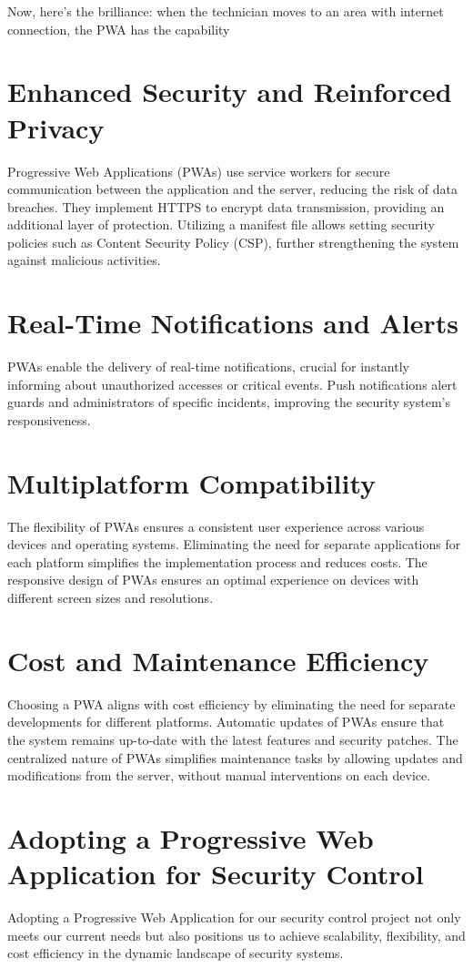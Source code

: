 \documentclass[journal]{IEEEtran}
\begin{document}
	Now, here's the brilliance: when the technician moves to an area with internet connection, the PWA has the capability
	
	\section*{Enhanced Security and Reinforced Privacy}
	Progressive Web Applications (PWAs) use service workers for secure communication between the application and the server, reducing the risk of data breaches. They implement HTTPS to encrypt data transmission, providing an additional layer of protection. Utilizing a manifest file allows setting security policies such as Content Security Policy (CSP), further strengthening the system against malicious activities.
	
	\section*{Real-Time Notifications and Alerts}
	PWAs enable the delivery of real-time notifications, crucial for instantly informing about unauthorized accesses or critical events. Push notifications alert guards and administrators of specific incidents, improving the security system's responsiveness.
	
	\section*{Multiplatform Compatibility}
	The flexibility of PWAs ensures a consistent user experience across various devices and operating systems. Eliminating the need for separate applications for each platform simplifies the implementation process and reduces costs. The responsive design of PWAs ensures an optimal experience on devices with different screen sizes and resolutions.
	
	\section*{Cost and Maintenance Efficiency}
	Choosing a PWA aligns with cost efficiency by eliminating the need for separate developments for different platforms. Automatic updates of PWAs ensure that the system remains up-to-date with the latest features and security patches. The centralized nature of PWAs simplifies maintenance tasks by allowing updates and modifications from the server, without manual interventions on each device.
	
	\section*{Adopting a Progressive Web Application for Security Control}
	Adopting a Progressive Web Application for our security control project not only meets our current needs but also positions us to achieve scalability, flexibility, and cost efficiency in the dynamic landscape of security systems.
	
\end{document}
